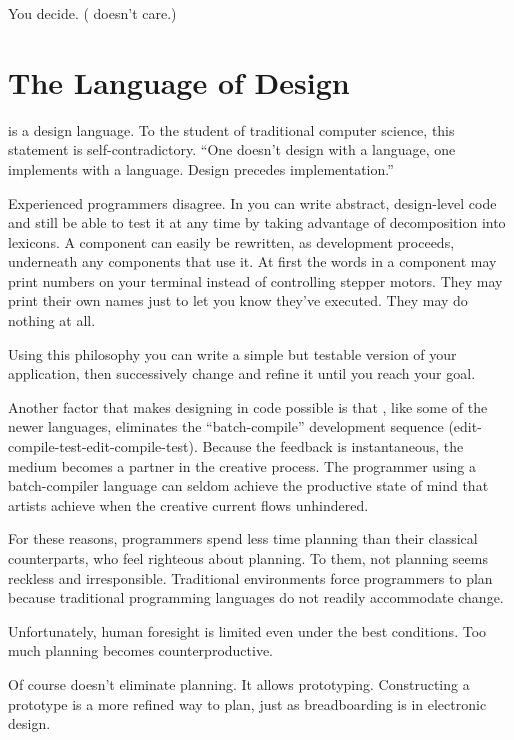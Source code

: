 You decide. (\Forth{} doesn't care.)


\section{The Language of Design}
%
\Forth{} is a design language. To the student of traditional computer
science, this statement is self-contradictory. ``One doesn't design
with a language, one implements with a language.  Design precedes
implementation.''

Experienced \Forth{} programmers disagree. In \Forth{} you can write
abstract, design-level code and still be able to test it at any time
by taking advantage of decomposition into lexicons. A component can
easily be rewritten, as development proceeds, underneath any
components that use it. At first the words in a component may print
numbers on your terminal instead of controlling stepper motors. They
may print their own names just to let you know they've executed. They
may do nothing at all.

Using this philosophy you can write a simple but testable version of
your application, then successively change and refine it until you
reach your goal.

Another factor that makes designing in code possible is that \Forth{},
like some of the newer languages, eliminates the ``batch-compile''%
development sequence (edit-compile-test-edit-compile-test). Because
the feedback is instantaneous, the medium becomes a partner in the
creative process. The programmer using a batch-compiler language can
seldom achieve the productive state of mind that artists achieve when
the creative current flows unhindered.

For these reasons, \Forth{} programmers spend less time planning than
their classical counterparts, who feel righteous about planning. To
them, not planning seems reckless and irresponsible. Traditional
environments force programmers to plan because traditional programming
languages do not readily accommodate change.

Unfortunately, human foresight is limited even under the best
conditions.  Too much planning becomes counterproductive.

Of course \Forth{} doesn't eliminate planning. It allows prototyping.%
Constructing a prototype is a more refined way to plan, just as
breadboarding is in electronic design.

